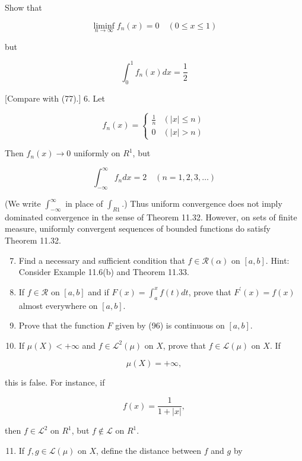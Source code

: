 \documentclass[10pt]{article}
\begin{document}
Show that

$$
\liminf _{n \rightarrow \infty} f_{n}(x)=0 \quad(0 \leq x \leq 1)
$$

but

$$
\int_{0}^{1} f_{n}(x) d x=\frac{1}{2}
$$

[Compare with (77).] 6. Let

$$
f_{n}(x)= \begin{cases}\frac{1}{n} & (|x| \leq n) \\ 0 & (|x|>n)\end{cases}
$$

Then $f_{n}(x) \rightarrow 0$ uniformly on $R^{1}$, but

$$
\int_{-\infty}^{\infty} f_{n} d x=2 \quad(n=1,2,3, \ldots)
$$

(We write $\int_{-\infty}^{\infty}$ in place of $\int_{R 1}$.) Thus uniform convergence does not imply dominated convergence in the sense of Theorem 11.32. However, on sets of finite measure, uniformly convergent sequences of bounded functions do satisfy Theorem 11.32.

\begin{enumerate}
  \setcounter{enumi}{6}
  \item Find a necessary and sufficient condition that $f \in \mathscr{R}(\alpha)$ on $[a, b]$. Hint: Consider Example 11.6(b) and Theorem 11.33.

  \item If $f \in \mathscr{R}$ on $[a, b]$ and if $F(x)=\int_{a}^{x} f(t) d t$, prove that $F^{\prime}(x)=f(x)$ almost everywhere on $[a, b]$.

  \item Prove that the function $F$ given by (96) is continuous on $[a, b]$.

  \item If $\mu(X)<+\infty$ and $f \in \mathscr{L}^{2}(\mu)$ on $X$, prove that $f \in \mathscr{L}(\mu)$ on $X$. If

\end{enumerate}

$$
\mu(X)=+\infty,
$$

this is false. For instance, if

$$
f(x)=\frac{1}{1+|x|},
$$

then $f \in \mathscr{L}^{2}$ on $R^{1}$, but $f \notin \mathscr{L}$ on $R^{1}$.

\begin{enumerate}
  \setcounter{enumi}{10}
  \item If $f, g \in \mathscr{L}(\mu)$ on $X$, define the distance between $f$ and $g$ by
\end{enumerate}
\end{document}

